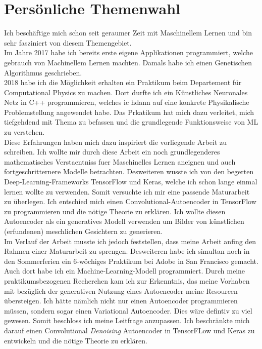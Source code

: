 \section*{Persönliche Themenwahl}
Ich beschäftige mich schon seit geraumer Zeit mit Maschinellem Lernen und bin
sehr fasziniert von diesem Themengebiet. \\
Im Jahre 2017 habe ich bereits erste eigene Applikationen programmiert, welche
gebrauch von Machinellem Lernen machten. Damals habe ich einen Genetischen
Algorithmus geschrieben. \\
2018 habe ich die Möglichkeit erhalten ein Praktikum beim Departement für
Computational Physics zu machen. Dort durfte ich ein Künstliches Neuronales Netz
in C++ programmieren, welches ic hdann auf eine konkrete Physikalische
Problemstellung angewendet habe. Das Prkatikum hat mich dazu verleitet, mich
tiefgehdend mit Thema zu befassen und die grundlegende Funktionsweise von ML zu verstehen. \\
Diese Erfahrungen haben mich dazu inspiriert die vorliegende Arbeit zu schreiben.
Ich wollte mir durch diese Arbeit ein noch grundlegenderes mathematisches
Verstaentniss fuer Maschinelles Lernen aneignen und auch fortgeschritternere
Modelle betrachten. Desweiteren wusste ich von den begerten
Deep-Learning-Frameworks TensorFlow und Keras, welche ich schon lange einmal
lernen wollte zu verwenden. Somit versuchte ich mir eine passende Maturarbeit zu überlegen.
\para{}
Ich entschied mich einen Convolutional-Autoencoder in TensorFlow zu
programmieren und die nötige Theorie zu erklären. Ich wollte diesen Autoencoder
als ein generatives Modell verwenden um Bilder von künstlichen (erfundenen)
meschlichen Gesichtern zu generieren. \\
Im Verlauf der Arbeit musste ich jedoch feststellen, dass meine Arbeit anfing
den Rahmen einer Maturarbeit zu sprengen. Desweiteren habe ich simultan noch in
den Sommerferien ein 6-wöchiges Praktikum bei Adobe in San Francisco gemacht.
Auch dort habe ich ein Machine-Learning-Modell programmiert. Durch meine
praktikumsbezogenen Recherchen kam ich zur Erkenntnis, das meine Vorhaben mit
bezüglich der generativen Nutzung eines Autoencoder meine Resourcen übersteigen.
Ich hätte nämlich nicht nur einen Autoencoder programmieren müssen, sondern
sogar einen Variational Autoencoder. Dies wäre defintiv zu viel gewesen.
\para{}
Somit beschloss ich meine Leitfrage anzupassen. Ich beschränkte mich darauf
einen Convolutional \textit{Denoising} Autoencoder in TensorFLow und Keras zu
entwickeln und die nötige Theorie zu erklären.


